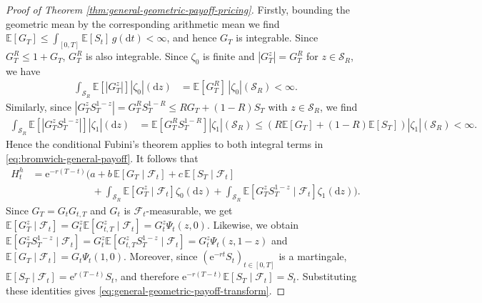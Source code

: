 \documentclass[10pt,a4paper,reqno]{amsart}
\theoremstyle{plain}
\theoremstyle{definition}
\theoremstyle{remark}
\theoremstyle{example}
\begin{document}
\begin{proof}[Proof of Theorem \ref{thm:general-geometric-payoff-pricing}]
    Firstly, bounding the geometric mean by the corresponding arithmetic mean we find $\mathbb{E}[G_T] \leq \int_{[0,T]} \mathbb{E}[S_t]\, g(\mathrm{d}t) < \infty$, and hence $G_T$ is integrable. Since $G_T^R \leq 1 + G_T$, $G_T^R$ is also integrable. Since $\zeta_0$ is finite and $|G_T^z|=G_T^R$ for $z\in\mathcal{S}_R$, we have
    \begin{align*}
        \int_{\mathcal{S}_R} \mathbb{E}\left[|G_T^z|\right] |\zeta_0|(\mathrm{d}z) &= \mathbb{E}[G_T^R]\, |\zeta_0|(\mathcal{S}_R) < \infty.
    \end{align*}
    Similarly, since $|G_T^zS_T^{1-z}| = G_T^R S_T^{1-R} \leq R G_T + (1-R)S_T$ with $z\in\mathcal{S}_R$, we find
    \begin{align*}
        \int_{\mathcal{S}_R} \mathbb{E}\left[ |G_T^zS_T^{1-z}| \right] |\zeta_1|(\mathrm{d}z) &=
        \mathbb{E}\left[ G_T^R S_T^{1-R} \right] |\zeta_1|(\mathcal{S}_R) \leq \left( R \mathbb{E}[G_T] + (1-R)\mathbb{E}[S_T] \right) |\zeta_1|(\mathcal{S}_R) < \infty.
    \end{align*}
    Hence the conditional Fubini's theorem applies to both integral terms in \eqref{eq:bromwich-general-payoff}. It follows that
    \begin{align*}
        H_t^h &= \mathrm{e}^{-r(T-t)} \Bigg( a + b\,\mathbb{E}\left[ G_T\mid\mathcal{F}_t \right] +  c\,\mathbb{E}\left[ S_T\mid\mathcal{F}_t \right] 
        \\ &\qquad \qquad \qquad + \int_{\mathcal{S}_R} \mathbb{E}\left[ G_T^z\mid\mathcal{F}_t \right] \zeta_0(\mathrm{d}z) + \int_{\mathcal{S}_R} \mathbb{E}\left[ G_T^zS_T^{1-z} \mid\mathcal{F}_t \right] \zeta_1(\mathrm{d}z) \Bigg).
    \end{align*}
    Since $G_T = G_tG_{t,T}$ and $G_t$ is $\mathcal{F}_t$-measurable, we get $\mathbb{E}\left[ G_T^z\mid\mathcal{F}_t \right] = G_t^z \mathbb{E}\left[ G_{t,T}^z\mid\mathcal{F}_t \right] = G_t^z\Psi_t(z,0)$. Likewise, we obtain $\mathbb{E}\left[ G_T^zS_T^{1-z} \mid\mathcal{F}_t \right] = G_t^z \mathbb{E}\left[ G_{t,T} ^zS_T^{1-z} \mid\mathcal{F}_t \right] = G_t^z\Psi_t(z,1-z)$ and $\mathbb{E}\left[ G_T\mid\mathcal{F}_t \right] = G_t\Psi_t(1,0)$. Moreover, since $(\mathrm{e}^{-rt}S_t)_{t\in[0,T]}$ is a martingale, $\mathbb{E}\left[ S_T\mid\mathcal{F}_t \right] = \mathrm{e}^{r(T-t)}S_t$, and therefore $\mathrm{e}^{-r(T-t)} \mathbb{E}\left[ S_T\mid\mathcal{F}_t \right] = S_t$. Substituting these identities gives
    \eqref{eq:general-geometric-payoff-transform}.


\end{proof}
\end{document}

